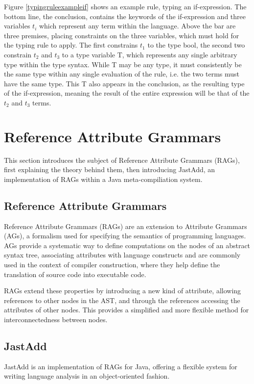 \documentclass[nofilelist]{cslthse-msc}
\begin{document}
Figure \ref{typingruleexampleif} shows an example rule, typing an if-expression.
The bottom line, the conclusion, contains the keywords of the if-expression and three variables $t_i$ which represent any term within the language.
Above the bar are three premises, placing constraints on the three variables, which must hold for the typing rule to apply.
The first constrains $t_1$ to the type bool, the second two constrain $t_2$ and $t_3$ to a type variable T, which represents any single arbitrary type within the type syntax.
While T may be any type, it must consistently be the same type within any single evaluation of the rule, i.e. the two terms must have the same type.
This T also appears in the conclusion, as the resulting type of the if-expression, meaning the result of the entire expression will be that of the $t_2$ and $t_3$ terms.

\section{Reference Attribute Grammars}
This section introduces the subject of Reference Attribute Grammars (RAGs), first explaining the theory behind them, then introducing JastAdd, an implementation of RAGs within a Java meta-compiliation system\cite{jastadd}.

\subsection{Reference Attribute Grammars}
Reference Attribute Grammars (RAGs) are an extension to Attribute Grammars (AGs), a formalism used for specifying the semantics of programming languages.
AGs provide a systematic way to define computations on the nodes of an abstract syntax tree, associating attributes with language constructs and are commonly used in the context of compiler construction, where they help define the translation of source code into executable code\cite{AGs}.

RAGs extend these properties by introducing a new kind of attribute, allowing references to other nodes in the AST, and through the references accessing the attributes of other nodes.
This provides a simplified and more flexible method for interconnectedness between nodes\cite{RAG}.

\subsection{JastAdd}
JastAdd is an implementation of RAGs for Java, offering a flexible system for writing language analysis in an object-oriented fashion.
\cite{JastAdd}
\end{document}
